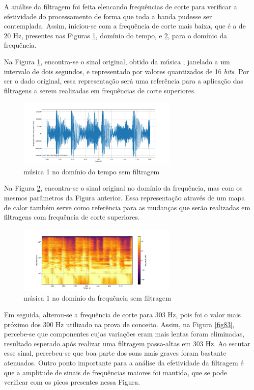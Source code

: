 A análise da filtragem foi feita elencando frequências de corte para verificar a efetividade do processamento de forma que toda a banda pudesse ser contemplada. Assim, iniciou-se com a frequência de corte mais baixa, que é a de 20 Hz, presentes nas Figuras \ref{fig81}, domínio do tempo, e \ref{fig82}, para o domínio da frequência.

Na Figura \ref{fig81}, encontra-se o sinal original, obtido da música \cite{track01}, janelado a um intervalo de dois segundos, e representado por valores quantizados de 16 \textit{bits}. Por ser o dado original, essa representação será uma referência para a aplicação das filtragens a serem realizadas em frequências de corte superiores. 

\begin{figure}[h]
    \centering
    \includegraphics[width=0.7\textwidth]{figuras/fig81.png}
    \caption{música 1 no domínio do tempo sem filtragem}
    \label{fig81}
\end{figure}


Na Figura \ref{fig82}, encontra-se o sinal original no domínio da frequência, mas com os mesmos parâmetros da Figura anterior. Essa representação através de um mapa de calor também serve como referência para as mudanças que serão realizadas em filtragens com frequência de corte superiores. 


\begin{figure}[h]
    \centering
    \includegraphics[width=0.7\textwidth]{figuras/fig82.png}
    \caption{música 1 no domínio da frequência sem filtragem}
    \label{fig82}
\end{figure}

Em seguida, alterou-se a frequência de corte para 303 Hz, pois foi o valor mais próximo dos 300 Hz utilizado na prova de conceito. Assim, na Figura \ref{fig83}, percebe-se que componentes cujas variações eram mais lentas foram eliminadas, resultado esperado após realizar uma filtragem passa-altas em 303 Hz. Ao escutar esse sinal, percebeu-se que boa parte dos sons mais graves foram bastante atenuados. Outro ponto importante para a análise da efetividade da filtragem é que a amplitude de sinais de frequências maiores foi mantida, que se pode verificar com os picos presentes nessa Figura.

